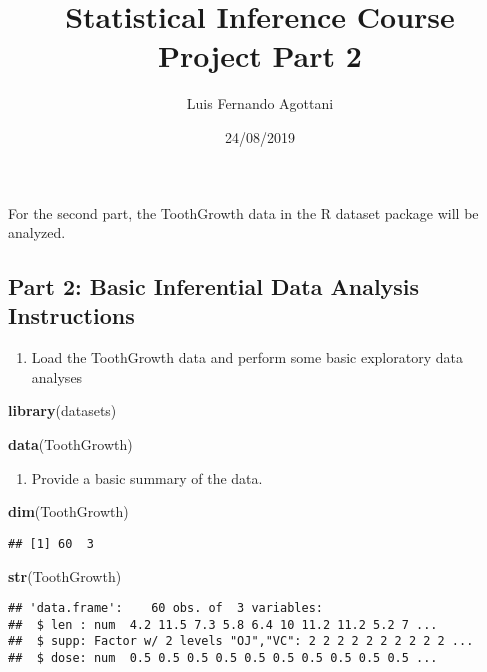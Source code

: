 \documentclass[]{article}
\title{Statistical Inference Course Project Part 2}
\author{Luis Fernando Agottani}
\date{24/08/2019}
\newenvironment{Shaded}{\begin{snugshade}}{\end{snugshade}}
\newcommand{\KeywordTok}[1]{\textcolor[rgb]{0.13,0.29,0.53}{\textbf{#1}}}
\newcommand{\NormalTok}[1]{#1}
\providecommand{\tightlist}{%
  \setlength{\itemsep}{0pt}\setlength{\parskip}{0pt}}
\begin{document}
\maketitle

For the second part, the ToothGrowth data in the R dataset package will
be analyzed.

\hypertarget{part-2-basic-inferential-data-analysis-instructions}{%
\subsection{Part 2: Basic Inferential Data Analysis
Instructions}\label{part-2-basic-inferential-data-analysis-instructions}}

\begin{enumerate}
\def\labelenumi{\arabic{enumi}.}
\tightlist
\item
  Load the ToothGrowth data and perform some basic exploratory data
  analyses
\end{enumerate}

\begin{Shaded}
\begin{Highlighting}[]
\KeywordTok{library}\NormalTok{(datasets)}

\KeywordTok{data}\NormalTok{(ToothGrowth)}
\end{Highlighting}
\end{Shaded}

\begin{enumerate}
\def\labelenumi{\arabic{enumi}.}
\setcounter{enumi}{1}
\tightlist
\item
  Provide a basic summary of the data.
\end{enumerate}

\begin{Shaded}
\begin{Highlighting}[]
\KeywordTok{dim}\NormalTok{(ToothGrowth)}
\end{Highlighting}
\end{Shaded}

\begin{verbatim}
## [1] 60  3
\end{verbatim}

\begin{Shaded}
\begin{Highlighting}[]
\KeywordTok{str}\NormalTok{(ToothGrowth)}
\end{Highlighting}
\end{Shaded}

\begin{verbatim}
## 'data.frame':    60 obs. of  3 variables:
##  $ len : num  4.2 11.5 7.3 5.8 6.4 10 11.2 11.2 5.2 7 ...
##  $ supp: Factor w/ 2 levels "OJ","VC": 2 2 2 2 2 2 2 2 2 2 ...
##  $ dose: num  0.5 0.5 0.5 0.5 0.5 0.5 0.5 0.5 0.5 0.5 ...
\end{verbatim}
\end{document}
